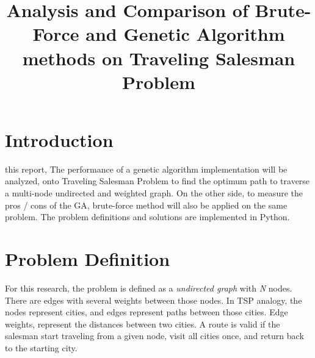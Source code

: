 \documentclass[journal,transmag]{IEEEtran}
\begin{document}
    \title{ Analysis and Comparison of Brute-Force and Genetic Algorithm methods
        on Traveling Salesman Problem }

    \author{   }



    \maketitle
    \IEEEdisplaynontitleabstractindextext \IEEEpeerreviewmaketitle

    \section{Introduction}

     this report, The performance of a genetic algorithm
    implementation will be analyzed, onto Traveling Salesman Problem to find
    the optimum path to traverse a multi-node undirected and weighted graph. On
    the other side, to measure the pros / cons of the GA, brute-force method
    will also be applied on the same problem. The problem definitions and
    solutions are implemented in Python.

    \section{Problem Definition}

    For this research, the problem is defined as a \textit{undirected graph}
    with \textit{N} nodes. There are edges with several weights between those nodes. In
    TSP analogy, the nodes represent cities, and edges represent paths between
    those cities. Edge weights, represent the distances between two cities. A
    route is valid if the salesman start traveling from a given node, visit all
    cities once, and return back to the starting city.
\end{document}
